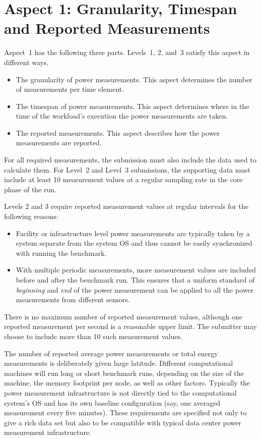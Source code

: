 \section{Aspect 1: Granularity, Timespan and Reported Measurements}
\label{sec:A1GTRM}
\noindent
Aspect~1 has the following three parts.
Levels~1, 2, and~3 satisfy this aspect in different ways.

\begin{itemize}
\item
The granularity of power measurements.
This aspect determines the number of measurements per time element.
\item
The timespan of power measurements.
This aspect determines where in the time of the workload's execution the power measurements are taken.
\item
The reported measurements.
This aspect describes how the power measurements are reported.
\end{itemize}

\noindent
For all required measurements, the submission must also include the data used to calculate them.
For Level~2 and Level~3 submissions, the supporting data must include at least 10 measurement values at a regular sampling rate in the core phase of the run.
\wl

\noindent
Levels 2 and 3 require reported measurement values at regular intervals for the following reasons:

\begin{itemize}
\item
Facility or infrastructure level power measurements are typically taken by a system separate from the system OS and thus cannot be easily synchronized with running the benchmark.
\item
With multiple periodic measurements, more measurement values are included before and after the benchmark run.
This ensures that a uniform standard of \textit{beginning} and \textit{end} of the power measurement can be applied to all the power measurements from different sensors.
\end{itemize}

\noindent
There is no maximum number of reported measurement values, although one reported measurement per second is a reasonable upper limit.
The submitter may choose to include more than 10 such measurement values.
\wl

\noindent
The number of reported average power measurements or total energy measurements is deliberately given large latitude.
Different computational machines will run long or short benchmark runs, depending on the size of the machine, the memory footprint per node, as well as other factors.
Typically the power measurement infrastructure is not directly tied to the computational system's OS and has its own baseline configuration (say, one averaged measurement every five minutes).
These requirements are specified not only to give a rich data set but also to be compatible with typical data center power measurement infrastructure.
\wl

